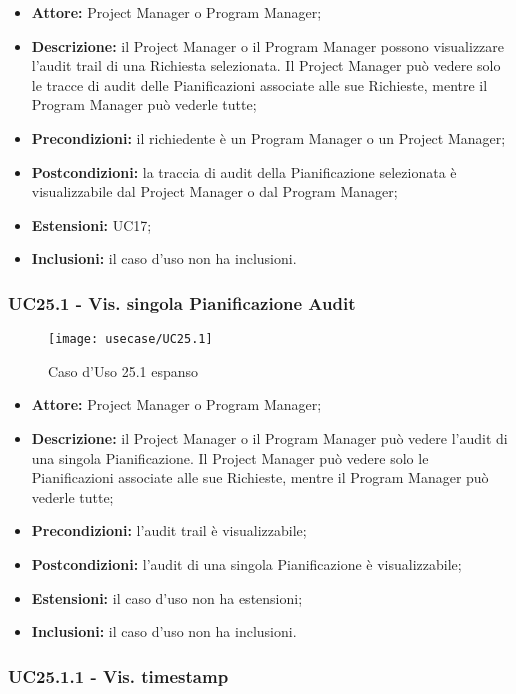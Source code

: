 \begin{itemize}[label=$\circ$]
\item \textbf{Attore:} Project Manager o Program Manager;
\item \textbf{Descrizione:} il Project Manager o il Program Manager possono visualizzare
l’audit trail di una Richiesta selezionata. Il Project Manager può vedere solo le tracce di audit delle Pianificazioni associate alle sue Richieste, mentre il Program Manager può vederle tutte;
\item \textbf{Precondizioni:} il richiedente è un Program Manager o un Project Manager;
\item \textbf{Postcondizioni:} la traccia di audit della Pianificazione selezionata è visualizzabile dal Project Manager o dal Program Manager;
\item \textbf{Estensioni:} UC17;
\item \textbf{Inclusioni:} il caso d'uso non ha inclusioni.
\end{itemize}


\subsubsection*{UC25.1 - Vis. singola Pianificazione Audit}
\begin{figure}[H] 
	\centering
    \texttt{[image: usecase/UC25.1]} 
    \caption{Caso d'Uso 25.1 espanso}
\end{figure}

\begin{itemize}[label=$\circ$]
\item \textbf{Attore:} Project Manager o Program Manager;
\item \textbf{Descrizione:} il Project Manager o il Program Manager può vedere l'audit di una singola Pianificazione. Il Project Manager può vedere solo le Pianificazioni associate alle sue Richieste, mentre il Program Manager può vederle tutte;
\item \textbf{Precondizioni:} l'audit trail è visualizzabile;
\item \textbf{Postcondizioni:} l'audit di una singola Pianificazione è visualizzabile;
\item \textbf{Estensioni:} il caso d'uso non ha estensioni;
\item \textbf{Inclusioni:} il caso d'uso non ha inclusioni.
\end{itemize}

\subsubsection*{UC25.1.1 - Vis. timestamp}

